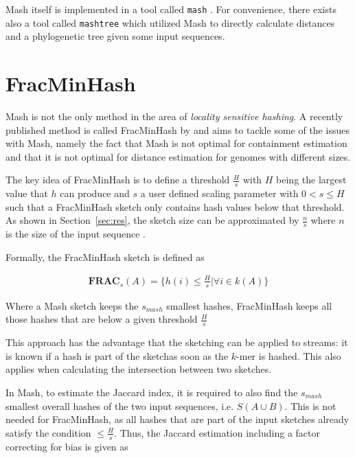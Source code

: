 Mash itself is implemented in a tool called \texttt{mash}
\cite{ondovMashFastGenome2016}. For convenience, there exists also a tool called
\texttt{mashtree} \cite{katzMashtreeRapidComparison2019} which utilized Mash to
directly calculate distances and a phylogenetic tree given some input sequences.

\section{FracMinHash}
Mash is not the only method in the area of \textit{locality sensitive hashing}.
A recently published method is called FracMinHash by
\cite{irberLightweightCompositionalAnalysis2022} and aims to tackle some of the
issues with Mash, namely the fact that Mash is not optimal for containment
estimation and that it is not optimal for distance estimation for genomes with
different sizes.

The key idea of FracMinHash is to define a threshold $\frac{H}{s}$ with $H$
being the largest value that $h$ can produce and $s$ a user defined scaling
parameter with $0 < s \leq H$ such that a FracMinHash sketch only contains hash
values below that threshold. As shown in Section~\ref{sec:res}, the sketch size can be
approximated by $\frac{n}{s}$ where $n$ is the size of the input sequence
\cite{irberLightweightCompositionalAnalysis2022,heraDebiasingFracMinHashDeriving2023}.


Formally, the FracMinHash sketch is defined as 

\begin{align}
  \mathbf{FRAC}_s(A) = \{h(i) \leq \frac{H}{s} | \forall i \in k(A)\}
\end{align}

Where a Mash sketch keeps the $s_{mash}$ smallest hashes, FracMinHash keeps all
those hashes that are below a given threshold $\frac{H}{s}$

This approach has the advantage that the sketching can be applied to streams: it
is known if a hash is part of the sketchas soon as the $k$-mer is hashed. This
also applies when calculating the intersection between two sketches. 

In Mash, to estimate the Jaccard index, it is required to also find the
$s_{mash}$ smallest overall hashes of the two input sequences, i.e. $S(A \cup
B)$. This is not needed for FracMinHash, as all hashes that are part of the
input sketches already satisfy the condition $\leq \frac{H}{s}$. Thus, the
Jaccard estimation including a factor correcting for bias is given as

